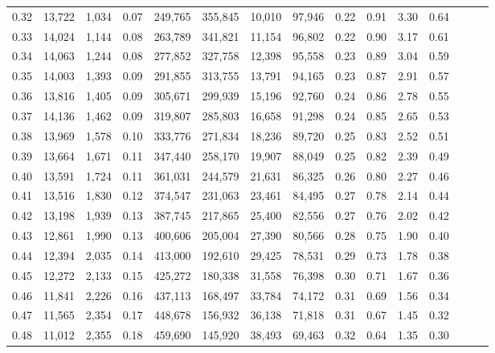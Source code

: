 \begin{tabular}{rrrrrrrrrrrrrrr}
0.32 &  13,722 &  1,034 &  0.07 &  249,765 &  355,845 &   10,010 &   97,946 &  0.22 &  0.91 &  3.30 &      0.64 \\
0.33 &  14,024 &  1,144 &  0.08 &  263,789 &  341,821 &   11,154 &   96,802 &  0.22 &  0.90 &  3.17 &      0.61 \\
0.34 &  14,063 &  1,244 &  0.08 &  277,852 &  327,758 &   12,398 &   95,558 &  0.23 &  0.89 &  3.04 &      0.59 \\
0.35 &  14,003 &  1,393 &  0.09 &  291,855 &  313,755 &   13,791 &   94,165 &  0.23 &  0.87 &  2.91 &      0.57 \\
0.36 &  13,816 &  1,405 &  0.09 &  305,671 &  299,939 &   15,196 &   92,760 &  0.24 &  0.86 &  2.78 &      0.55 \\
0.37 &  14,136 &  1,462 &  0.09 &  319,807 &  285,803 &   16,658 &   91,298 &  0.24 &  0.85 &  2.65 &      0.53 \\
0.38 &  13,969 &  1,578 &  0.10 &  333,776 &  271,834 &   18,236 &   89,720 &  0.25 &  0.83 &  2.52 &      0.51 \\
0.39 &  13,664 &  1,671 &  0.11 &  347,440 &  258,170 &   19,907 &   88,049 &  0.25 &  0.82 &  2.39 &      0.49 \\
0.40 &  13,591 &  1,724 &  0.11 &  361,031 &  244,579 &   21,631 &   86,325 &  0.26 &  0.80 &  2.27 &      0.46 \\
0.41 &  13,516 &  1,830 &  0.12 &  374,547 &  231,063 &   23,461 &   84,495 &  0.27 &  0.78 &  2.14 &      0.44 \\
0.42 &  13,198 &  1,939 &  0.13 &  387,745 &  217,865 &   25,400 &   82,556 &  0.27 &  0.76 &  2.02 &      0.42 \\
0.43 &  12,861 &  1,990 &  0.13 &  400,606 &  205,004 &   27,390 &   80,566 &  0.28 &  0.75 &  1.90 &      0.40 \\
0.44 &  12,394 &  2,035 &  0.14 &  413,000 &  192,610 &   29,425 &   78,531 &  0.29 &  0.73 &  1.78 &      0.38 \\
0.45 &  12,272 &  2,133 &  0.15 &  425,272 &  180,338 &   31,558 &   76,398 &  0.30 &  0.71 &  1.67 &      0.36 \\
0.46 &  11,841 &  2,226 &  0.16 &  437,113 &  168,497 &   33,784 &   74,172 &  0.31 &  0.69 &  1.56 &      0.34 \\
0.47 &  11,565 &  2,354 &  0.17 &  448,678 &  156,932 &   36,138 &   71,818 &  0.31 &  0.67 &  1.45 &      0.32 \\
0.48 &  11,012 &  2,355 &  0.18 &  459,690 &  145,920 &   38,493 &   69,463 &  0.32 &  0.64 &  1.35 &      0.30 \\

\end{tabular}
